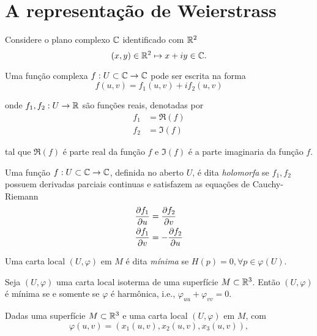 \section{A representação de Weierstrass}

Considere o plano complexo $\mathbb{C}$ identificado com $\mathbb{R}^2$
\begin{equation*}
	(x,y) \in \mathbb{R}^2 \mapsto x + iy \in \mathbb{C}.
\end{equation*}

Uma função complexa $f: U \subset \mathbb{C} \rightarrow \mathbb{C}$ pode ser escrita na forma
\begin{equation*}
	f(u,v) = f_1(u,v) + i f_2(u,v)
\end{equation*}

onde $f_1, f_2: U \rightarrow \mathbb{R}$ são funções reais, denotadas por
\begin{align*}
	f_1 &= \Re(f)\\
	f_2 &= \Im(f)
\end{align*}

tal que $\Re(f)$ é parte real da função $f$ e $\Im(f)$ é a parte imaginaria da função $f$.

\begin{defi}
	Uma função $f: U \subset \mathbb{C} \rightarrow \mathbb{C}$, definida no aberto $U$, é dita \emph{holomorfa} se $f_1, f_2$ possuem derivadas parciais continuas e satisfazem as equações de Cauchy-Riemann
	\begin{align*}
		\frac{\partial f_1}{\partial u} &= \frac{\partial f_2}{\partial v}\\
		\frac{\partial f_1}{\partial v} &= - \frac{\partial f_2}{\partial u}
	\end{align*}
\end{defi}

\begin{defi}
	Uma carta local $(U, \varphi)$ em $M$ é dita \emph{mínima} se $H(p) = 0, \forall p \in \varphi(U)$.
\end{defi}

\begin{corolario}\label{equiv_isoterma_harmonica}
	Seja $(U, \varphi)$ uma carta local isoterma de uma superfície $M \subset \mathbb{R}^3$. Então $(U, \varphi)$ é mínima se e somente se $\varphi$ é harmônica, i.e., $\varphi_{uu} + \varphi_{vv} = 0$.
\end{corolario}

Dadas uma superfície $M \subset \mathbb{R}^3$ e uma carta local $(U, \varphi)$ em $M$, com
\begin{equation*}
	\varphi(u,v) = (x_1(u,v), x_2(u,v), x_3(u,v)),
\end{equation*}

